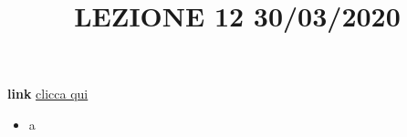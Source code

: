\title{LEZIONE 12 30/03/2020}\newline
\textbf{link} \href{https://web.microsoftstream.com/video/22a546ac-3e6b-43e0-b0f9-45a630661700?list=user&userId=faa91214-a6f5-40d7-8875-253fd49b8ce1}{clicca qui}
\begin{itemize}
    \item a
\end{itemize}